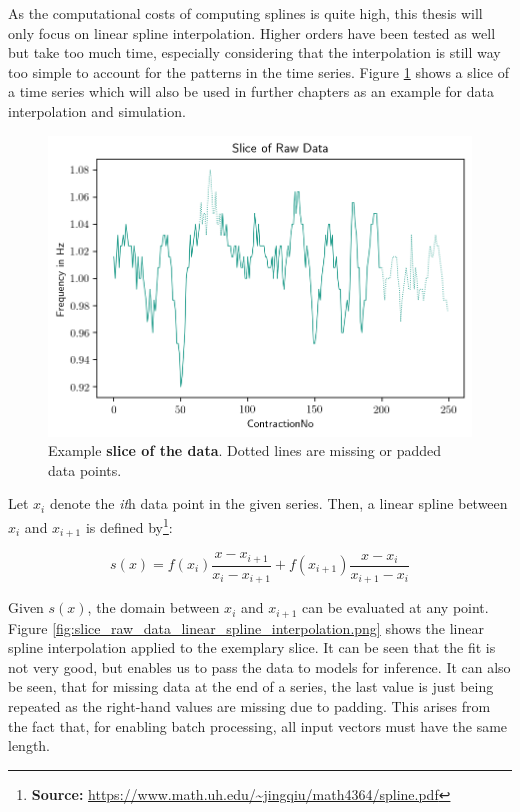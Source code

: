 \documentclass[11pt]{scrartcl}
\begin{document}
As the computational costs of computing splines is quite high, this thesis will only focus on linear spline interpolation. Higher orders have been tested as well but take too much time, especially considering that the interpolation is still way too simple to account for the patterns in the time series. Figure \ref{fig:slice_raw_data} shows a slice of a time series which will also be used in further chapters as an example for data interpolation and simulation.

\begin{figure}[hbt]
	\center
	\includegraphics[width=1.0\textwidth]{img/general/slice_raw_data.png}
	\caption{Example \textcolor{viridis5}{\textbf{slice of the data}}. Dotted lines are missing or padded data points.}
	\label{fig:slice_raw_data}
\end{figure}

Let $x_i$ denote the \textit{it}h data point in the given series. Then, a linear spline between $x_i$ and $x_{i+1}$ is defined by\footnote{\textbf{Source:} \url{https://www.math.uh.edu/\~jingqiu/math4364/spline.pdf}}:

\begin{equation}
	s(x) = f(x_i) \frac{x - x_{i+1}}{x_i - x_{i+1}} + f(x_{i+1}) \frac{x - x_i}{x_{i+1} - x_i}
\end{equation}

Given $s(x)$, the domain between $x_i$ and $x_{i+1}$ can be evaluated at any point. Figure \ref{fig:slice_raw_data_linear_spline_interpolation.png} shows the linear spline interpolation applied to the exemplary slice. It can be seen that the fit is not very good, but enables us to pass the data to models for inference. It can also be seen, that for missing data at the end of a series, the last value is just being repeated as the right-hand values are missing due to padding. This arises from the fact that, for enabling batch processing, all input vectors must have the same length.
\end{document}
